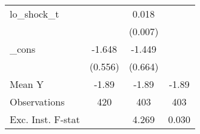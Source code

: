 {\begin{tabular}{l*{3}{c}}
\addlinespace
lo\_shock\_t  &                     &       0.018\sym{**} &                     \\
            &                     &     (0.007)         &                     \\
\addlinespace
\_cons      &      -1.648\sym{***}&      -1.449\sym{**} &                     \\
            &     (0.556)         &     (0.664)         &                     \\
\midrule
Mean Y      &       -1.89         &       -1.89         &       -1.89         \\
Observations&         420         &         403         &         403         \\
Exc. Inst. F-stat&                     &       4.269         &       0.030         \\
\bottomrule
\end{tabular}
}
